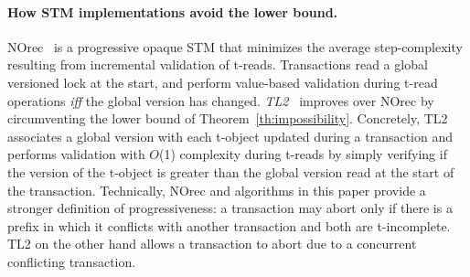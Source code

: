 \paragraph{How STM implementations avoid the lower bound.}
NOrec~\cite{norec} is a progressive opaque STM that minimizes the average step-complexity resulting from incremental 
validation of t-reads. Transactions read a global versioned lock at the start, and perform value-based validation
during t-read operations \emph{iff} the global version has changed.
\emph{TL2}~\cite{DSS06} improves over NOrec by circumventing the lower bound
of Theorem~\ref{th:impossibility}. Concretely, TL2 associates a global version with each t-object updated during
a transaction and performs validation with $O$(1) complexity during t-reads by simply verifying if the version
of the t-object is greater than the global version read at the start of the transaction. Technically,
NOrec and algorithms in this paper provide a stronger definition of progressiveness: a transaction may abort
only if there is a prefix in which it conflicts with another transaction and both are t-incomplete. TL2 on the other hand allows
a transaction to abort due to a concurrent conflicting transaction.

